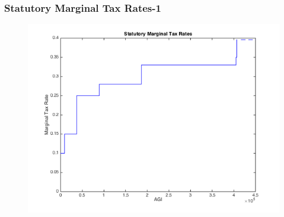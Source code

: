 \documentclass{beamer}
\begin{document}

\begin{frame}
\frametitle[alignment=center]{Statutory Marginal Tax Rates-1}
\begin{figure}
\centering
\includegraphics[scale=0.5]{STR_1}
\end{figure}
\end{frame}
\end{document}
